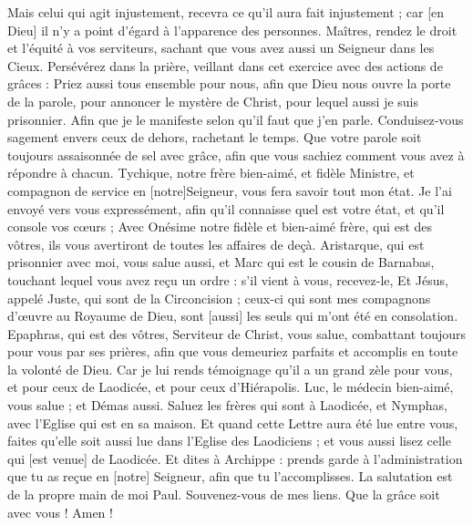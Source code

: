 \begin{multicols}{2}
Mais celui qui agit injustement, recevra ce qu'il aura fait injustement ; car [en Dieu] il n'y a point d'égard à l'apparence des personnes.
\VerseOne{}Maîtres, rendez le droit et l'équité à vos serviteurs, sachant que vous avez aussi un Seigneur dans les Cieux.
Persévérez dans la prière, veillant dans cet exercice avec des actions de grâces :
Priez aussi tous ensemble pour nous, afin que Dieu nous ouvre la porte de la parole, pour annoncer le mystère de Christ, pour lequel aussi je suis prisonnier.
Afin que je le manifeste selon qu'il faut que j'en parle.
Conduisez-vous sagement envers ceux de dehors, rachetant le temps.
Que votre parole soit toujours assaisonnée de sel avec grâce, afin que vous sachiez comment vous avez à répondre à chacun.
Tychique, notre frère bien-aimé, et fidèle Ministre, et compagnon de service en [notre]Seigneur, vous fera savoir tout mon état.
Je l'ai envoyé vers vous expressément, afin qu'il connaisse quel est votre état, et qu'il console vos cœurs ;
Avec Onésime notre fidèle et bien-aimé frère, qui est des vôtres, ils vous avertiront de toutes les affaires de deçà.
Aristarque, qui est prisonnier avec moi, vous salue aussi, et Marc qui est le cousin de Barnabas, touchant lequel vous avez reçu un ordre : s'il vient à vous, recevez-le,
Et Jésus, appelé Juste, qui sont de la Circoncision ; ceux-ci qui sont mes compagnons d'œuvre au Royaume de Dieu, sont [aussi] les seuls qui m'ont été en consolation.
Epaphras, qui est des vôtres, Serviteur de Christ, vous salue, combattant toujours pour vous par ses prières, afin que vous demeuriez parfaits et accomplis en toute la volonté de Dieu.
Car je lui rends témoignage qu'il a un grand zèle pour vous, et pour ceux de Laodicée, et pour ceux d'Hiérapolis.
Luc, le médecin bien-aimé, vous salue ; et Démas aussi.
Saluez les frères qui sont à Laodicée, et Nymphas, avec l'Eglise qui est en sa maison.
Et quand cette Lettre aura été lue entre vous, faites qu'elle soit aussi lue dans l'Eglise des Laodiciens ; et vous aussi lisez celle qui [est venue] de Laodicée.
Et dites à Archippe : prends garde à l'administration que tu as reçue en [notre] Seigneur, afin que tu l'accomplisses.
La salutation est de la propre main de moi Paul. Souvenez-vous de mes liens. Que la grâce soit avec vous ! Amen !
\PPE{}
\end{multicols}
